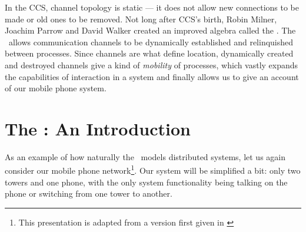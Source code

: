 	In the CCS, channel topology is static ---  it does not allow new connections to be made or old ones to be removed.  
Not long after CCS's birth, Robin Milner, Joachim Parrow and David Walker created an improved algebra called the \inidx{\picalc}.  
The \picalc\ allows communication channels to be dynamically established and relinquished between processes.  
Since channels are what define location, dynamically created and destroyed channels give a kind of \emph{mobility} of processes, which vastly expands the capabilities of interaction in a system and finally allows us to give an account of our mobile phone system.
\section{The \picalc: An Introduction}	
	As an example of how naturally the \picalc\ models distributed systems, let us again consider our mobile phone network\footnote{This presentation is adapted from a version first given in \cite{miln99}}.  
Our system will be simplified a bit: only two towers and one phone, with the only system functionality being talking on the phone or switching from one tower to another.
	
